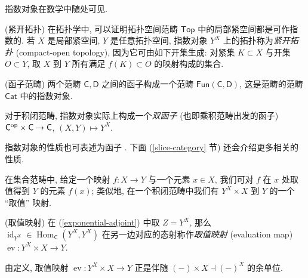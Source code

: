
指数对象在数学中随处可见.

\begin{example}
    {(紧开拓扑)}
    在拓扑学中, 可以证明拓扑空间范畴 $\mathsf {Top}$ 中的局部紧空间都是可作指数的.
    若 $X$ 是局部紧空间, $Y$ 是任意拓扑空间,
    指数对象 $Y^X$ 上的拓扑称为\emph{紧开拓扑} (compact-open topology),
    因为它可由如下开集生成:
    对紧集 $K\subset X$ 与开集 $O\subset Y$,
    取 $X$ 到 $Y$ 所有满足 $f(K) \subset O$ 的映射构成的集合.
\end{example}

\begin{example}
    {(函子范畴)}
    两个范畴 $\mathsf C,\mathsf D$ 之间的函子构成一个范畴 $\mathsf {Fun}(\mathsf C,\mathsf D)$, 这是范畴的范畴 $\mathsf {Cat}$ 中的指数对象.
\end{example}

\begin{prop}
    {}
    对于积闭范畴, 指数对象实际上构成一个\emph{双函子} (也即乘积范畴出发的函子) $\mathsf C^{\text{op}}\times\mathsf C \to \mathsf C$, $(X,Y)\mapsto Y^X$.
\end{prop}

    指数对象的性质也可表述为函子 . 下面 (\ref{slice-category} 节) 还会介绍更多相关的性质.
    

    

在集合范畴中, 给定一个映射 $f\colon X\to Y$ 与一个元素 $x\in X$, 我们可对 $f$ 在 $x$ 处取值得到 $Y$ 的元素 $f(x)$; 类似地, 在一个积闭范畴中我们有 $Y^X\times X$ 到 $Y$ 的一个 ``取值'' 映射.

\begin{definition}
    [label={evaluation-map}]
    {(取值映射)}
    在 (\ref{exponential-adjoint}) 中取 $Z=Y^X$, 那么 $\operatorname{id}_{Y^X}\in \operatorname{Hom}_{\mathsf C}(Y^X,Y^X)$ 在另一边对应的态射称作\emph{取值映射} (evaluation map) $\operatorname{ev}\colon Y^X\times X \to Y$.
\end{definition}

由定义, 取值映射 $\operatorname{ev}\colon Y^X\times X \to Y$ 正是伴随 $(-)\times X \dashv (-)^X$ 的余单位.



